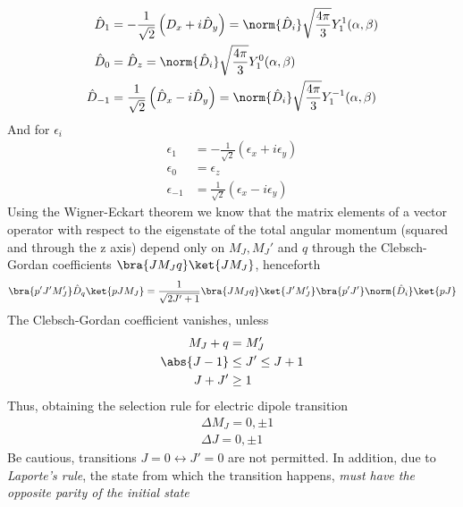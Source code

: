 \documentclass[a4paper, 11pt]{book}
\newcommand{\1}{\opr{\mathds{1}}}
\newcommand{\opr}[1]{\hat{#1}}
\theoremstyle{plain}
\begin{document}
	\begin{equation}
		\begin{aligned}
			\opr{D}_1&=-\frac{1}{\sqrt{2}}\left( D_x+i\opr{D}_y \right)=\norm{\opr{D}_i}\sqrt{\frac{4\pi}{3}}Y^1_1(\alpha,\beta)\\
			\opr{D}_0&=\opr{D}_z=\norm{\opr{D}_i}\sqrt{\frac{4\pi}{3}}Y^0_1(\alpha,\beta)\\
			\opr{D}_{-1}&=\frac{1}{\sqrt{2}}\left( \opr{D}_x-i\opr{D}_y \right)=\norm{\opr{D}_i}\sqrt{\frac{4\pi}{3}}Y^{-1}_1(\alpha,\beta)
		\end{aligned}
		\label{eq:doprsphcomp}
	\end{equation}
	And for $\epsilon_i$
	\begin{equation}
		\begin{aligned}
			\epsilon_1&=-\frac{1}{\sqrt{2}}\left( \epsilon_x+i\epsilon_y \right)\\
			\epsilon_0&= \epsilon_z\\
			\epsilon_{-1}&= \frac{1}{\sqrt{2}}\left( \epsilon_x-i\epsilon_y \right)
		\end{aligned}
		\label{eq:polversphcomp}
	\end{equation}
	Using the Wigner-Eckart theorem we know that the matrix elements of a vector operator with respect to the eigenstate of the total angular momentum (squared and through the z axis) depend only on $M_J,M_J'$ and $q$ through the Clebsch-Gordan coefficients $\bra{JM_Jq}\ket{JM_J}$, henceforth
	\begin{equation}
		\bra{p'J'M_J'}\opr{D}_q\ket{pJM_J}=\frac{1}{\sqrt{2J'+1}}\bra{JM_Jq}\ket{J'M_J'}\bra{p'J'}\norm{\opr{D}_i}\ket{pJ}
		\label{eq:selecrulej}
	\end{equation}
	The Clebsch-Gordan coefficient vanishes, unless
	\begin{equation}
		\begin{aligned}
			M_J+q&=M_J'\\
			\abs{J-1}&\le J'\le J+1\\
			J+J'&\ge1
		\end{aligned}
		\label{eq:nonzerocgcoeff}
	\end{equation}
	Thus, obtaining the selection rule for electric dipole transition
	\begin{equation}
		\begin{aligned}
			&\boxed{\boxed{\Delta M_J=0,\pm1}}\\
			&\boxed{\boxed{\Delta J=0,\pm1}}
		\end{aligned}
		\label{eq:selectionrulemj}
	\end{equation}
	Be cautious, transitions $J=0\leftrightarrow J'=0$ are not permitted. In addition, due to \textit{Laporte's rule}, the state from which the transition happens, \emph{must have the opposite parity of the initial state}
\end{document}
